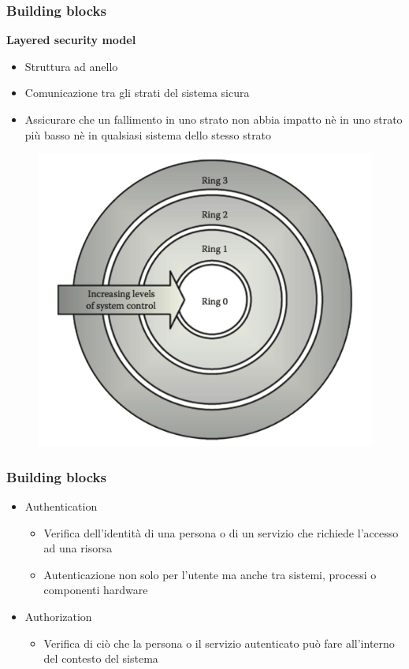 \begin{frame}
  \frametitle{Building blocks}
  \textbf{Layered security model}
  \begin{itemize}
  \item Struttura ad anello 
  \item Comunicazione tra gli strati del sistema sicura
  \item Assicurare che un fallimento in uno strato non abbia impatto nè in uno strato più basso nè in qualsiasi sistema dello stesso strato
  \end{itemize}
    	\begin{figure}[h] 
		\includegraphics[scale=0.1]{imgs/ring.png}
	\end{figure}
\end{frame}


\begin{frame}
  \frametitle{Building blocks}
  \begin{itemize}[<+- | alert@+>]
  \item Authentication
  \begin{itemize}[<+- | alert@+>]
  \item Verifica dell'identità di una persona o di un servizio che richiede l'accesso ad una risorsa
  \item Autenticazione non solo per l'utente ma anche tra sistemi, processi o componenti hardware
  \end{itemize}
 \item Authorization
 	\begin{itemize}
 		\item Verifica di ciò che la persona o il servizio autenticato può fare all'interno del contesto del sistema
 	\end{itemize}
  \end{itemize}
\end{frame}

